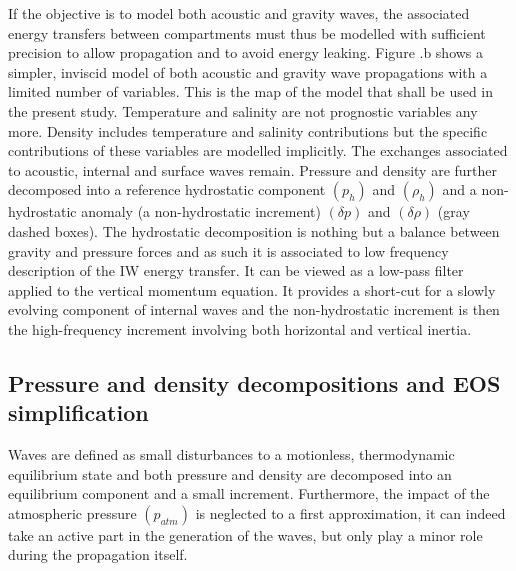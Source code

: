 \documentclass[a4paper,11pt]{article}
\begin{document}
If the objective is to model both acoustic and gravity waves, the associated energy transfers between compartments must thus be modelled with sufficient precision to allow propagation and to avoid energy leaking. Figure .b shows a simpler, inviscid model of both acoustic and gravity wave propagations with a limited number of variables. This is the map of the model that shall be used in the present study. Temperature and salinity are not prognostic variables any more. Density includes temperature and salinity contributions but the specific contributions of these variables are modelled implicitly. The exchanges associated to acoustic, internal and surface waves remain. Pressure and density are further decomposed into a reference hydrostatic component $(p_h)$ and $(\rho_h)$ and a non-hydrostatic anomaly (a non-hydrostatic increment) $(\delta p)$ and $(\delta\rho)$ (gray dashed boxes). The hydrostatic decomposition is nothing but a balance between gravity and pressure forces and as such it is associated to low frequency description of the IW energy transfer. It can be viewed as a low-pass filter applied to the vertical momentum equation. It provides a short-cut for a slowly evolving component of internal waves and the non-hydrostatic increment is then the high-frequency increment involving both horizontal and vertical inertia.\\

\subsection{Pressure and density decompositions and EOS simplification}
\label{SubSectionPRHO}

Waves are defined as small disturbances to a motionless, thermodynamic equilibrium state and both pressure and density are decomposed into an equilibrium component and a small increment. Furthermore, the impact of the atmospheric pressure $(p_{atm})$ is neglected to a first approximation, it can indeed take an active part in the generation of the waves, but only play a minor role during the propagation itself. 
\end{document}
